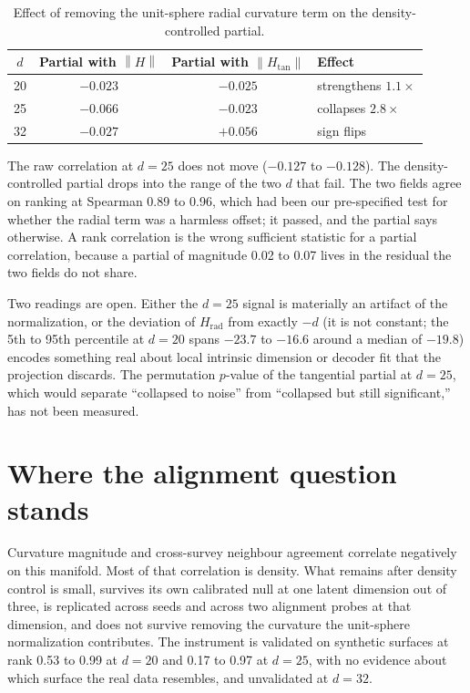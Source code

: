\documentclass[11pt,a4paper]{article}
\newcommand{\Htan}{H_{\mathrm{tan}}}
\newcommand{\Hrad}{H_{\mathrm{rad}}}
\newcommand{\norm}[1]{\left\lVert #1 \right\rVert}
\begin{document}
\begin{table}[h]
\centering
\begin{tabular}{cccl}
\toprule
$d$ & Partial with $\norm{H}$ & Partial with $\norm{\Htan}$ & Effect \\
\midrule
20 & $-0.023$ & $-0.025$ & strengthens $1.1\times$ \\
25 & $-0.066$ & $-0.023$ & collapses $2.8\times$ \\
32 & $-0.027$ & $+0.056$ & sign flips \\
\bottomrule
\end{tabular}
\caption{Effect of removing the unit-sphere radial curvature term on the density-controlled partial.}
\label{tab:radial}
\end{table}

The raw correlation at $d = 25$ does not move ($-0.127$ to $-0.128$). The density-controlled partial drops into the range of the two $d$ that fail. The two fields agree on ranking at Spearman 0.89 to 0.96, which had been our pre-specified test for whether the radial term was a harmless offset; it passed, and the partial says otherwise. A rank correlation is the wrong sufficient statistic for a partial correlation, because a partial of magnitude 0.02 to 0.07 lives in the residual the two fields do not share.

Two readings are open. Either the $d = 25$ signal is materially an artifact of the normalization, or the deviation of $\Hrad$ from exactly $-d$ (it is not constant; the 5th to 95th percentile at $d = 20$ spans $-23.7$ to $-16.6$ around a median of $-19.8$) encodes something real about local intrinsic dimension or decoder fit that the projection discards. The permutation $p$-value of the tangential partial at $d = 25$, which would separate ``collapsed to noise'' from ``collapsed but still significant,'' has not been measured.

\section{Where the alignment question stands}

Curvature magnitude and cross-survey neighbour agreement correlate negatively on this manifold. Most of that correlation is density. What remains after density control is small, survives its own calibrated null at one latent dimension out of three, is replicated across seeds and across two alignment probes at that dimension, and does not survive removing the curvature the unit-sphere normalization contributes. The instrument is validated on synthetic surfaces at rank 0.53 to 0.99 at $d = 20$ and 0.17 to 0.97 at $d = 25$, with no evidence about which surface the real data resembles, and unvalidated at $d = 32$.
\end{document}
